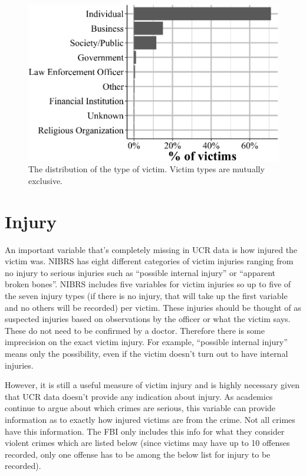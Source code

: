 \documentclass[
  12pt,
  openany]{book}
\begin{document}
\begin{figure}

{\centering \includegraphics[width=0.9\linewidth]{15_nibrs_victim_files/figure-latex/victimType-1} 

}

\caption{The distribution of the type of victim. Victim types are mutually exclusive.}\label{fig:victimType}
\end{figure}

\section{Injury}\label{injury}

An important variable that's completely missing in UCR data is how injured the victim was. NIBRS has eight different categories of victim injuries ranging from no injury to serious injuries such as ``possible internal injury'' or ``apparent broken bones''. NIBRS includes five variables for victim injuries so up to five of the seven injury types (if there is no injury, that will take up the first variable and no others will be recorded) per victim. These injuries should be thought of as suspected injuries based on observations by the officer or what the victim says. These do not need to be confirmed by a doctor. Therefore there is some imprecision on the exact victim injury. For example, ``possible internal injury'' means only the possibility, even if the victim doesn't turn out to have internal injuries.

However, it is still a useful measure of victim injury and is highly necessary given that UCR data doesn't provide any indication about injury. As academics continue to argue about which crimes are serious, this variable can provide information as to exactly how injured victims are from the crime. Not all crimes have this information. The FBI only includes this info for what they consider violent crimes which are listed below (since victims may have up to 10 offenses recorded, only one offense has to be among the below list for injury to be recorded).
\end{document}
